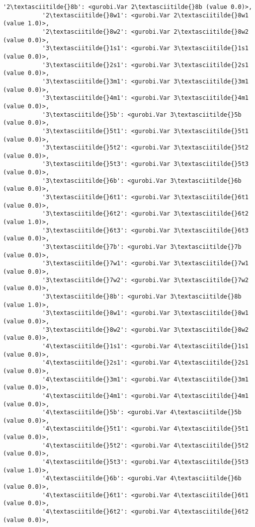 \documentclass[11pt]{article}
\begin{document}
\begin{Verbatim}[commandchars=\\\{\}]
           '2\textasciitilde{}8b': <gurobi.Var 2\textasciitilde{}8b (value 0.0)>,
           '2\textasciitilde{}8w1': <gurobi.Var 2\textasciitilde{}8w1 (value 1.0)>,
           '2\textasciitilde{}8w2': <gurobi.Var 2\textasciitilde{}8w2 (value 0.0)>,
           '3\textasciitilde{}1s1': <gurobi.Var 3\textasciitilde{}1s1 (value 0.0)>,
           '3\textasciitilde{}2s1': <gurobi.Var 3\textasciitilde{}2s1 (value 0.0)>,
           '3\textasciitilde{}3m1': <gurobi.Var 3\textasciitilde{}3m1 (value 0.0)>,
           '3\textasciitilde{}4m1': <gurobi.Var 3\textasciitilde{}4m1 (value 0.0)>,
           '3\textasciitilde{}5b': <gurobi.Var 3\textasciitilde{}5b (value 0.0)>,
           '3\textasciitilde{}5t1': <gurobi.Var 3\textasciitilde{}5t1 (value 0.0)>,
           '3\textasciitilde{}5t2': <gurobi.Var 3\textasciitilde{}5t2 (value 0.0)>,
           '3\textasciitilde{}5t3': <gurobi.Var 3\textasciitilde{}5t3 (value 0.0)>,
           '3\textasciitilde{}6b': <gurobi.Var 3\textasciitilde{}6b (value 0.0)>,
           '3\textasciitilde{}6t1': <gurobi.Var 3\textasciitilde{}6t1 (value 0.0)>,
           '3\textasciitilde{}6t2': <gurobi.Var 3\textasciitilde{}6t2 (value 1.0)>,
           '3\textasciitilde{}6t3': <gurobi.Var 3\textasciitilde{}6t3 (value 0.0)>,
           '3\textasciitilde{}7b': <gurobi.Var 3\textasciitilde{}7b (value 0.0)>,
           '3\textasciitilde{}7w1': <gurobi.Var 3\textasciitilde{}7w1 (value 0.0)>,
           '3\textasciitilde{}7w2': <gurobi.Var 3\textasciitilde{}7w2 (value 0.0)>,
           '3\textasciitilde{}8b': <gurobi.Var 3\textasciitilde{}8b (value 1.0)>,
           '3\textasciitilde{}8w1': <gurobi.Var 3\textasciitilde{}8w1 (value 0.0)>,
           '3\textasciitilde{}8w2': <gurobi.Var 3\textasciitilde{}8w2 (value 0.0)>,
           '4\textasciitilde{}1s1': <gurobi.Var 4\textasciitilde{}1s1 (value 0.0)>,
           '4\textasciitilde{}2s1': <gurobi.Var 4\textasciitilde{}2s1 (value 0.0)>,
           '4\textasciitilde{}3m1': <gurobi.Var 4\textasciitilde{}3m1 (value 0.0)>,
           '4\textasciitilde{}4m1': <gurobi.Var 4\textasciitilde{}4m1 (value 0.0)>,
           '4\textasciitilde{}5b': <gurobi.Var 4\textasciitilde{}5b (value 0.0)>,
           '4\textasciitilde{}5t1': <gurobi.Var 4\textasciitilde{}5t1 (value 0.0)>,
           '4\textasciitilde{}5t2': <gurobi.Var 4\textasciitilde{}5t2 (value 0.0)>,
           '4\textasciitilde{}5t3': <gurobi.Var 4\textasciitilde{}5t3 (value 1.0)>,
           '4\textasciitilde{}6b': <gurobi.Var 4\textasciitilde{}6b (value 0.0)>,
           '4\textasciitilde{}6t1': <gurobi.Var 4\textasciitilde{}6t1 (value 0.0)>,
           '4\textasciitilde{}6t2': <gurobi.Var 4\textasciitilde{}6t2 (value 0.0)>,

\end{Verbatim}
\end{document}
